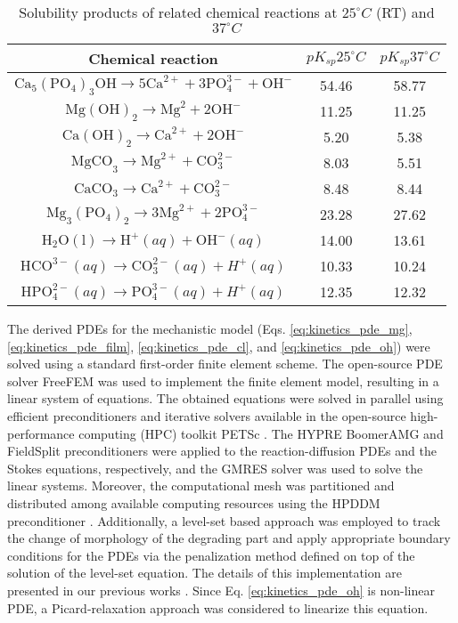 \begin{table}[h]
\caption[Solubility products of related chemical reactions]{Solubility products of related chemical reactions at $25^{\circ}C$ (RT) and $37^{\circ}C$ \cite{Wang2022}}
\medskip
\centering
\begin{tabular}{ccc}
\hline
Chemical reaction & $pK_{sp} 25^{\circ}C$ & $pK_{sp} 37^{\circ}C$ \\ \hline
$\mathrm{Ca}_{5}\left(\mathrm{PO}_{4}\right)_{3} \mathrm{OH}  \rightarrow 5 \mathrm{Ca}^{2+}+3 \mathrm{PO}_{4}^{3-}+\mathrm{OH}^{-}$ & 54.46 & 58.77 \\
$\mathrm{Mg}(\mathrm{OH})_{2}  \rightarrow \mathrm{Mg}^{2}+2 \mathrm{OH}^{-}$ & 11.25 & 11.25 \\
$\mathrm{Ca}(\mathrm{OH})_{2} \rightarrow \mathrm{Ca}^{2+}+2 \mathrm{OH}^{-}$ & 5.20 & 5.38 \\
$\mathrm{MgCO}_{3} \rightarrow \mathrm{Mg}^{2+}+\mathrm{CO}_{3}^{2-}$ & 8.03 & 5.51 \\
$\mathrm{CaCO}_{3}  \rightarrow \mathrm{Ca}^{2+}+\mathrm{CO}_{3}^{2-}$ & 8.48 & 8.44 \\
$\mathrm{Mg}_{3}\left(\mathrm{PO}_{4}\right)_{2}  \rightarrow 3 \mathrm{Mg}^{2+}+2 \mathrm{PO}_{4}^{3-}$ & 23.28 & 27.62 \\
$\mathrm{H}_{2} \mathrm{O}(\mathrm{l})  \rightarrow \mathrm{H}^{+}(aq)+\mathrm{OH}^{-}(a q)$ & 14.00 & 13.61 \\
$\mathrm{HCO}^{3-}(aq) \rightarrow \mathrm{CO}_{3}^{2-}(aq)+H^{+}(aq)$ & 10.33 & 10.24 \\
$\mathrm{HPO}_{4}^{2-}(aq) \rightarrow \mathrm{PO}_{4}^{3-}(a q)+H^{+}(aq)$ & 12.35 & 12.32 \\
\hline
\end{tabular}
\label{tab:kinetics_reactions}
\end{table}

The derived PDEs for the mechanistic model (Eqs. \ref{eq:kinetics_pde_mg}, \ref{eq:kinetics_pde_film}, \ref{eq:kinetics_pde_cl}, and \ref{eq:kinetics_pde_oh}) were solved using a standard first-order finite element scheme. The open-source PDE solver FreeFEM \cite{Hecht2012} was used to implement the finite element model, resulting in a linear system of equations. The obtained equations were solved in parallel using efficient preconditioners and iterative solvers available in the open-source high-performance computing (HPC) toolkit PETSc \cite{petsc}. The HYPRE BoomerAMG \cite{Falgout2002} and FieldSplit preconditioners were applied to the reaction-diffusion PDEs and the Stokes equations, respectively, and the GMRES solver \cite{Saad1986} was used to solve the linear systems. Moreover, the computational mesh was partitioned and distributed among available computing resources using the HPDDM preconditioner \cite{Jolivet2013}. Additionally, a level-set based approach was employed to track the change of morphology of the degrading part and apply appropriate boundary conditions for the PDEs via the penalization method defined on top of the solution of the level-set equation. The details of this implementation are presented in our previous works \cite{Barzegari2021, Barzegari2022}. Since Eq. \ref{eq:kinetics_pde_oh} is non-linear PDE, a Picard-relaxation approach was considered to linearize this equation.

